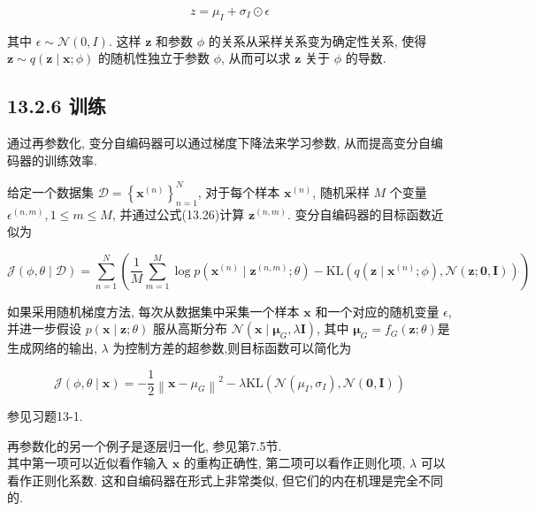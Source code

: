\documentclass[10pt]{article}
\begin{document}
\begin{equation*}
z=\mu_{I}+\sigma_{I} \odot \epsilon \tag{13.26}
\end{equation*}


其中 $\epsilon \sim \mathcal{N}(0, I)$. 这样 $\boldsymbol{z}$ 和参数 $\phi$ 的关系从采样关系变为确定性关系, 使得 $\boldsymbol{z} \sim q(\boldsymbol{z} \mid \boldsymbol{x} ; \phi)$ 的随机性独立于参数 $\phi$, 从而可以求 $\boldsymbol{z}$ 关于 $\phi$ 的导数.

\subsection*{13.2.6 训练}
通过再参数化, 变分自编码器可以通过梯度下降法来学习参数, 从而提高变分自编码器的训练效率.

给定一个数据集 $\mathcal{D}=\left\{\boldsymbol{x}^{(n)}\right\}_{n=1}^{N}$, 对于每个样本 $\boldsymbol{x}^{(n)}$, 随机采样 $M$ 个变量 $\epsilon^{(n, m)}, 1 \leq m \leq M$, 并通过公式(13.26)计算 $\boldsymbol{z}^{(n, m)}$. 变分自编码器的目标函数近似为


\begin{equation*}
\mathcal{J}(\phi, \theta \mid \mathcal{D})=\sum_{n=1}^{N}\left(\frac{1}{M} \sum_{m=1}^{M} \log p\left(\boldsymbol{x}^{(n)} \mid \boldsymbol{z}^{(n, m)} ; \theta\right)-\mathrm{KL}\left(q\left(\boldsymbol{z} \mid \boldsymbol{x}^{(n)} ; \phi\right), \mathcal{N}(\boldsymbol{z} ; \mathbf{0}, \boldsymbol{I})\right)\right) \tag{13.27}
\end{equation*}


如果采用随机梯度方法, 每次从数据集中采集一个样本 $\boldsymbol{x}$ 和一个对应的随机变量 $\epsilon$, 并进一步假设 $p(\boldsymbol{x} \mid \boldsymbol{z} ; \theta)$ 服从高斯分布 $\mathcal{N}\left(\boldsymbol{x} \mid \boldsymbol{\mu}_{G}, \lambda \boldsymbol{I}\right)$, 其中 $\boldsymbol{\mu}_{G}=f_{G}(\boldsymbol{z} ; \theta)$是生成网络的输出, $\lambda$ 为控制方差的超参数,则目标函数可以简化为


\begin{equation*}
\mathcal{J}(\phi, \theta \mid \boldsymbol{x})=-\frac{1}{2}\left\|\boldsymbol{x}-\mu_{G}\right\|^{2}-\lambda \mathrm{KL}\left(\mathcal{N}\left(\mu_{I}, \sigma_{I}\right), \mathcal{N}(\mathbf{0}, \boldsymbol{I})\right) \tag{13.28}
\end{equation*}


参见习题13-1.

再参数化的另一个例子是逐层归一化, 参见第7.5节.\\
其中第一项可以近似看作输入 $\boldsymbol{x}$ 的重构正确性, 第二项可以看作正则化项, $\lambda$ 可以看作正则化系数. 这和自编码器在形式上非常类似, 但它们的内在机理是完全不同的.
\end{document}
